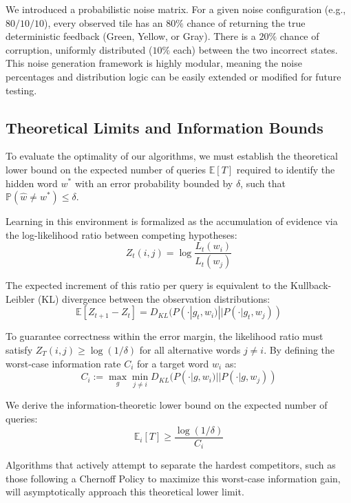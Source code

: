 \documentclass[12pt, a4paper]{article}
\begin{document}
We introduced a probabilistic noise matrix. For a given noise configuration (e.g., $80/10/10$), every observed tile has an $80\%$ chance of returning the true deterministic feedback (Green, Yellow, or Gray). There is a $20\%$ chance of corruption, uniformly distributed ($10\%$ each) between the two incorrect states. This noise generation framework is highly modular, meaning the noise percentages and distribution logic can be easily extended or modified for future testing.

\subsection{Theoretical Limits and Information Bounds}
To evaluate the optimality of our algorithms, we must establish the theoretical lower bound on the expected number of queries $\mathbb{E}[T]$ required to identify the hidden word $w^*$ with an error probability bounded by $\delta$, such that $\mathbb{P}(\hat{w} \neq w^*) \leq \delta$.

Learning in this environment is formalized as the accumulation of evidence via the log-likelihood ratio between competing hypotheses:
$$Z_t(i,j) = \log \frac{L_t(w_i)}{L_t(w_j)}$$

The expected increment of this ratio per query is equivalent to the Kullback-Leibler (KL) divergence between the observation distributions:
$$\mathbb{E}[Z_{t+1} - Z_t] = D_{KL}(P(\cdot|g_t, w_i) || P(\cdot|g_t, w_j))$$

To guarantee correctness within the error margin, the likelihood ratio must satisfy $Z_T(i,j) \geq \log(1/\delta)$ for all alternative words $j \neq i$. By defining the worst-case information rate $C_i$ for a target word $w_i$ as:
$$C_i := \max_g \min_{j \neq i} D_{KL}(P(\cdot|g, w_i) || P(\cdot|g, w_j))$$

We derive the information-theoretic lower bound on the expected number of queries:
$$\mathbb{E}_i[T] \geq \frac{\log(1/\delta)}{C_i}$$

Algorithms that actively attempt to separate the hardest competitors, such as those following a Chernoff Policy to maximize this worst-case information gain, will asymptotically approach this theoretical lower limit.
\end{document}

